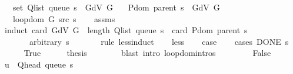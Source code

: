 \begin{isabellebody}
\ \ \ {\isachardoublequoteopen}set\ {\isacharparenleft}{\kern0pt}Q{\isacharunderscore}{\kern0pt}list\ {\isacharparenleft}{\kern0pt}queue\ s{\isacharparenright}{\kern0pt}{\isacharparenright}{\kern0pt}\ {\isasymsubseteq}\ G{\isachardot}{\kern0pt}dV\ G{\isachardoublequoteclose}\isanewline
\ \ \ {\isachardoublequoteopen}P{\isachardot}{\kern0pt}dom\ {\isacharparenleft}{\kern0pt}parent\ s{\isacharparenright}{\kern0pt}\ {\isasymsubseteq}\ G{\isachardot}{\kern0pt}dV\ G{\isachardoublequoteclose}\isanewline
\ \ \ {\isachardoublequoteopen}loop{\isacharunderscore}{\kern0pt}dom\ {\isacharparenleft}{\kern0pt}G{\isacharcomma}{\kern0pt}\ src{\isacharcomma}{\kern0pt}\ s{\isacharparenright}{\kern0pt}{\isachardoublequoteclose}\isanewline
%
\isadelimproof
\ \ %
\endisadelimproof
%
\isatagproof
{}\isamarkupfalse%
\ assms\isanewline
{}\isamarkupfalse%
\ {\isacharparenleft}{\kern0pt}induct\ {\isachardoublequoteopen}card\ {\isacharparenleft}{\kern0pt}G{\isachardot}{\kern0pt}dV\ G{\isacharparenright}{\kern0pt}\ {\isacharplus}{\kern0pt}\ length\ {\isacharparenleft}{\kern0pt}Q{\isacharunderscore}{\kern0pt}list\ {\isacharparenleft}{\kern0pt}queue\ s{\isacharparenright}{\kern0pt}{\isacharparenright}{\kern0pt}\ {\isacharminus}{\kern0pt}\ card\ {\isacharparenleft}{\kern0pt}P{\isachardot}{\kern0pt}dom\ {\isacharparenleft}{\kern0pt}parent\ s{\isacharparenright}{\kern0pt}{\isacharparenright}{\kern0pt}{\isachardoublequoteclose}\isanewline
\ \ \ \ \ \ \ arbitrary{\isacharcolon}{\kern0pt}\ s\isanewline
\ \ \ \ \ \ \ rule{\isacharcolon}{\kern0pt}\ less{\isacharunderscore}{\kern0pt}induct{\isacharparenright}{\kern0pt}\isanewline
\ \ \isamarkupfalse%
\ less\isanewline
\ \ \isamarkupfalse%
\ {\isacharquery}{\kern0pt}case\isanewline
\ \ \isamarkupfalse%
\ {\isacharparenleft}{\kern0pt}cases\ {\isachardoublequoteopen}DONE\ s{\isachardoublequoteclose}{\isacharparenright}{\kern0pt}\isanewline
\ \ \ \ \isamarkupfalse%
\ True\isanewline
\ \ \ \ \isamarkupfalse%
\ {\isacharquery}{\kern0pt}thesis\isanewline
\ \ \ \ \ \ \isamarkupfalse%
\ {\isacharparenleft}{\kern0pt}blast\ intro{\isacharcolon}{\kern0pt}\ loop{\isachardot}{\kern0pt}domintros{\isacharparenright}{\kern0pt}\isanewline
\ \ \isamarkupfalse%
\isanewline
\ \ \ \ \isamarkupfalse%
\ False\isanewline
\ \ \ \ \isamarkupfalse%
\ {\isacharquery}{\kern0pt}u\ {\isacharequal}{\kern0pt}\ {\isachardoublequoteopen}Q{\isacharunderscore}{\kern0pt}head\ {\isacharparenleft}{\kern0pt}queue\ s{\isacharparenright}{\kern0pt}{\isachardoublequoteclose}\isanewline

\end{isabellebody}
